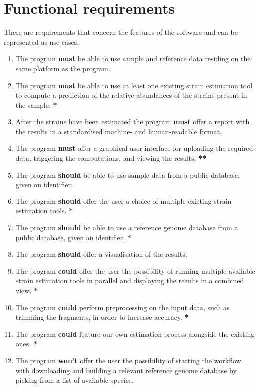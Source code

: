 \documentclass{report}
\begin{document}
\section{Functional requirements}
These are requirements that concern the features of the software and can be represented as use cases.
\begin{enumerate}
    \item The program \textbf{must} be able to use sample and reference data residing on the same platform as the program.
    \item The program \textbf{must} be able to use at least one existing strain estimation tool to compute a prediction of the relative abundances of the strains present in the sample. \textbf{*}
    \item After the strains have been estimated the program \textbf{must} offer a report with the results in a standardised machine- and human-readable format.
    \item The program \textbf{must} offer a graphical user interface for uploading the required data, triggering the computations, and viewing the results. \textbf{**}
    
    \item The program \textbf{should} be able to use sample data from a public database, given an identifier.
    \item The program \textbf{should} offer the user a choice of multiple existing strain estimation tools. \textbf{*}
    \item The program \textbf{should} be able to use a reference genome database from a public database, given an identifier. \textbf{*}
    \item The program \textbf{should} offer a visualisation of the results.
    
    \item The program \textbf{could} offer the user the possibility of running multiple available strain estimation tools in parallel and displaying the results in a combined view. \textbf{*}
    \item The program \textbf{could} perform preprocessing on the input data, such as trimming the fragments, in order to increase accuracy. \textbf{*}
    \item The program \textbf{could} feature our own estimation process   alongside the existing ones. \textbf{*}
    
    \item The program \textbf{won't} offer the user the possibility of starting the workflow with downloading and building a relevant reference genome database by picking from a list of available species.
\end{enumerate}
\end{document}
